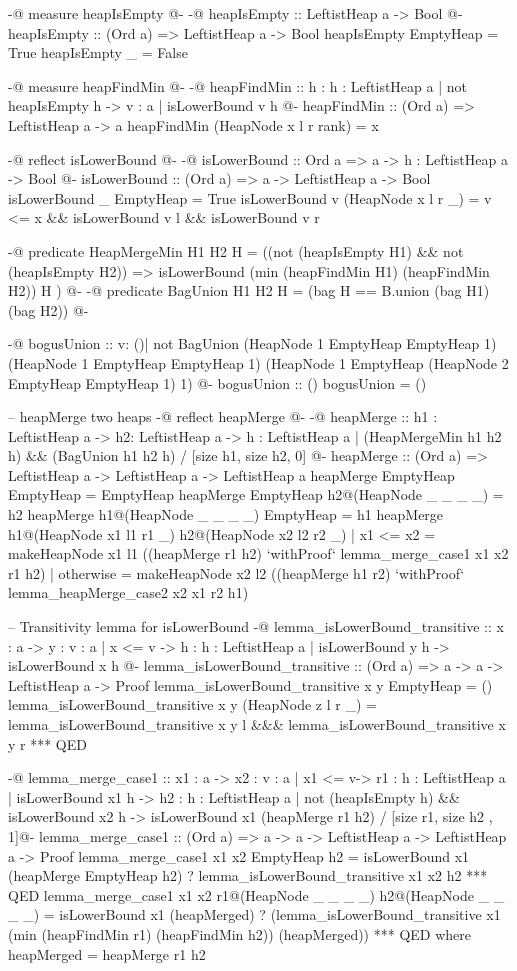 \begin{code}[caption={Leftist Heap}, label={lst:leftist-heap}]
{-@ measure heapIsEmpty @-}
{-@ heapIsEmpty :: LeftistHeap a -> Bool @-}
heapIsEmpty :: (Ord a) => LeftistHeap a -> Bool
heapIsEmpty EmptyHeap = True
heapIsEmpty _ = False

{-@ measure heapFindMin @-}
{-@ heapFindMin :: h : { h : LeftistHeap a | not heapIsEmpty h } -> {v : a | isLowerBound v h} @-}
heapFindMin :: (Ord a) => LeftistHeap a -> a
heapFindMin (HeapNode x l r rank) = x

{-@ reflect isLowerBound @-}
{-@ isLowerBound :: Ord a => a -> h : LeftistHeap a -> Bool @-}
isLowerBound :: (Ord a) => a -> LeftistHeap a -> Bool
isLowerBound _ EmptyHeap = True
isLowerBound v (HeapNode x l r _) = v <= x && isLowerBound v l && isLowerBound v r

{-@ predicate HeapMergeMin H1 H2 H = ((not (heapIsEmpty H1) && not (heapIsEmpty H2)) => isLowerBound (min (heapFindMin H1) (heapFindMin H2)) H ) @-}
{-@ predicate BagUnion H1 H2 H = (bag H == B.union (bag H1) (bag H2)) @-}

{-@ bogusUnion :: {v: ()| not BagUnion (HeapNode 1 EmptyHeap EmptyHeap 1) (HeapNode 1 EmptyHeap EmptyHeap 1) (HeapNode 1 EmptyHeap (HeapNode 2 EmptyHeap EmptyHeap 1) 1)} @-}
bogusUnion :: ()
bogusUnion = ()

-- heapMerge two heaps
{-@ reflect heapMerge @-}
{-@ heapMerge :: h1 : LeftistHeap a -> h2: LeftistHeap a -> { h : LeftistHeap a | (HeapMergeMin h1 h2 h) && (BagUnion h1 h2 h) } / [size h1, size h2, 0] @-}
heapMerge :: (Ord a) => LeftistHeap a -> LeftistHeap a -> LeftistHeap a
heapMerge EmptyHeap EmptyHeap = EmptyHeap
heapMerge EmptyHeap h2@(HeapNode _ _ _ _) = h2
heapMerge h1@(HeapNode _ _ _ _) EmptyHeap = h1
heapMerge h1@(HeapNode x1 l1 r1 _) h2@(HeapNode x2 l2 r2 _)
  | x1 <= x2 = makeHeapNode x1 l1 ((heapMerge r1 h2) `withProof` lemma_merge_case1 x1 x2 r1 h2)
  | otherwise = makeHeapNode x2 l2 ((heapMerge h1 r2) `withProof` lemma_heapMerge_case2 x2 x1 r2 h1)

-- Transitivity lemma for isLowerBound
{-@ lemma_isLowerBound_transitive :: x : a -> y : {v : a | x <= v} -> h : {h : LeftistHeap a | isLowerBound y h} -> {isLowerBound x h} @-}
lemma_isLowerBound_transitive :: (Ord a) => a -> a -> LeftistHeap a -> Proof
lemma_isLowerBound_transitive x y EmptyHeap = ()
lemma_isLowerBound_transitive x y (HeapNode z l r _) = lemma_isLowerBound_transitive x y l &&& lemma_isLowerBound_transitive x y r *** QED

{-@ lemma_merge_case1 :: x1 : a  -> x2 : { v : a |  x1  <= v}-> r1 : {h : LeftistHeap a | isLowerBound x1 h} -> h2 : {h : LeftistHeap a | not (heapIsEmpty h) && isLowerBound x2 h}  -> {isLowerBound x1 (heapMerge r1 h2)} / [size r1, size h2 , 1]@-}
lemma_merge_case1 :: (Ord a) => a -> a -> LeftistHeap a -> LeftistHeap a -> Proof
lemma_merge_case1 x1 x2 EmptyHeap h2 =
  isLowerBound x1 (heapMerge EmptyHeap h2)
    ? lemma_isLowerBound_transitive x1 x2 h2
    *** QED
lemma_merge_case1 x1 x2 r1@(HeapNode _ _ _ _) h2@(HeapNode _ _ _ _) =
  isLowerBound x1 (heapMerged)
    ? (lemma_isLowerBound_transitive x1 (min (heapFindMin r1) (heapFindMin h2)) (heapMerged))
    *** QED
 where
  heapMerged = heapMerge r1 h2


\end{code}
